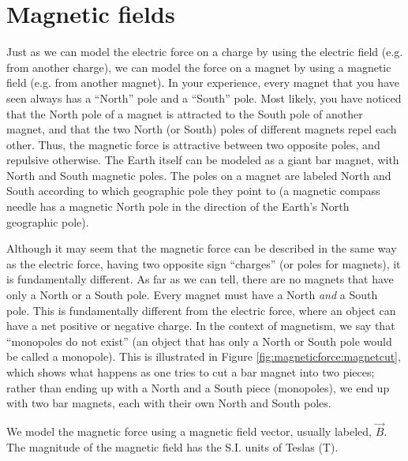 \section{Magnetic fields}
Just as we can model the electric force on a charge by using the electric field (e.g. from another charge), we can model the force on a magnet by using a magnetic field (e.g. from another magnet). In your experience, every magnet that you have seen always has a ``North'' pole and a ``South'' pole. Most likely, you have noticed that the North pole of a magnet is attracted to the South pole of another magnet, and that the two North (or South) poles of different magnets repel each other. Thus, the magnetic force is attractive between two opposite poles, and repulsive otherwise. The Earth itself can be modeled as a giant bar magnet, with North and South magnetic poles. The poles on a magnet are labeled North and South according to which geographic pole they point to (a magnetic compass needle has a magnetic North pole in the direction of the Earth's North geographic pole).

Although it may seem that the magnetic force can be described in the same way as the electric force, having two opposite sign ``charges'' (or poles for magnets), it is fundamentally different. As far as we can tell, there are no magnets that have only a North or a South pole. Every magnet must have a North \textit{and} a South pole. This is fundamentally different from the electric force, where an object can have a net positive or negative charge. In the context of magnetism, we say that ``monopoles do not exist'' (an object that has only a North or South pole would be called a monopole). This is illustrated in Figure \ref{fig:magneticforce:magnetcut}, which shows what happens as one tries to cut a bar magnet into two pieces; rather than ending up with a North and a South piece (monopoles), we end up with two bar magnets, each with their own North and South poles.


We model the magnetic force using a magnetic field vector, usually labeled, $\vec B$. The magnitude of the magnetic field has the S.I. units of Teslas (\si{T}). 
 
